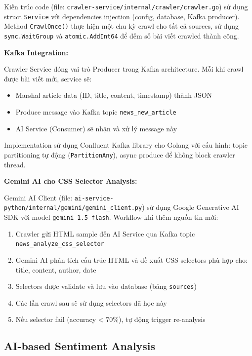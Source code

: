 Kiến trúc code (file: \texttt{crawler-service/internal/crawler/crawler.go}) sử dụng struct \texttt{Service} với dependencies injection (config, database, Kafka producer). Method \texttt{CrawlOnce()} thực hiện một chu kỳ crawl cho tất cả sources, sử dụng \texttt{sync.WaitGroup} và \texttt{atomic.AddInt64} để đếm số bài viết crawled thành công.

\noindent\textbf{Kafka Integration:}

Crawler Service đóng vai trò Producer trong Kafka architecture. Mỗi khi crawl được bài viết mới, service sẽ:
\begin{itemize}
    \item Marshal article data (ID, title, content, timestamp) thành JSON
    \item Produce message vào Kafka topic \texttt{news\_new\_article}
    \item AI Service (Consumer) sẽ nhận và xử lý message này
\end{itemize}

Implementation sử dụng Confluent Kafka library cho Golang với cấu hình: topic partitioning tự động (\texttt{PartitionAny}), async produce để không block crawler thread.

\noindent\textbf{Gemini AI cho CSS Selector Analysis:}

Gemini AI Client (file: \texttt{ai-service-python/internal/gemini/gemini\_client.py}) sử dụng Google Generative AI SDK với model \texttt{gemini-1.5-flash}. Workflow khi thêm nguồn tin mới:

\begin{enumerate}
    \item Crawler gửi HTML sample đến AI Service qua Kafka topic \texttt{news\_analyze\_css\_selector}
    \item Gemini AI phân tích cấu trúc HTML và đề xuất CSS selectors phù hợp cho: title, content, author, date
    \item Selectors được validate và lưu vào database (bảng \texttt{sources})
    \item Các lần crawl sau sẽ sử dụng selectors đã học này
    \item Nếu selector fail (accuracy < 70\%), tự động trigger re-analysis
\end{enumerate}

\subsection{AI-based Sentiment Analysis}

